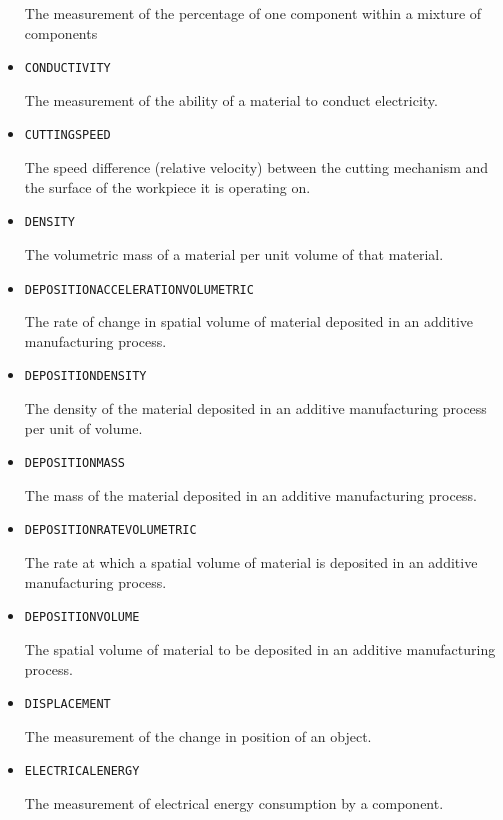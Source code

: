 \begin{itemize}
The measurement of the percentage of one component within a mixture of components


\item \texttt{CONDUCTIVITY}  

The measurement of the ability of a material to conduct electricity.


\item \texttt{CUTTING\textunderscore SPEED}  

The speed difference (relative velocity) between the cutting mechanism and the surface of the workpiece it is operating on.


\item \texttt{DENSITY}  

The volumetric mass of a material per unit volume of that material.


\item \texttt{DEPOSITION\textunderscore ACCELERATION\textunderscore VOLUMETRIC}  

The rate of change in spatial volume of material deposited in an additive manufacturing process.


\item \texttt{DEPOSITION\textunderscore DENSITY}  

The density of the material deposited in an additive manufacturing process per unit of volume.


\item \texttt{DEPOSITION\textunderscore MASS}  

The mass of the material deposited in an additive manufacturing process.


\item \texttt{DEPOSITION\textunderscore RATE\textunderscore VOLUMETRIC}  

The rate at which a spatial volume of material is deposited in an additive manufacturing process.


\item \texttt{DEPOSITION\textunderscore VOLUME}  

The spatial volume of material to be deposited in an additive manufacturing process.


\item \texttt{DISPLACEMENT}  

The measurement of the change in position of an object.


\item \texttt{ELECTRICAL\textunderscore ENERGY}  

The measurement of electrical energy consumption by a component.



\end{itemize}
